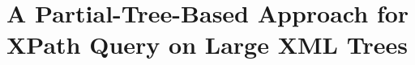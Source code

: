 \def\PT#1{\hbox{\textrm{pt}$_{#1}$}}
\def\Nc#1#2{\hbox{\texttt{#1$_{#2}$}}}
\def\Nl#1#2{\hbox{+\texttt{#1$_{#2}$}}}
\def\Nr#1#2{\hbox{\texttt{#1$_{#2}$}+}}
\def\Np#1#2{\hbox{+\texttt{#1$_{#2}$}+}}
\def\pred#1#2{#1\to\{#2\}}
\def\INDEXSET#1{\mathit{#1}_{[P]}}
\def\INDEXSETL#1{\mathit{#1}_{[p]}}

 

\newtheorem{property}{Property}


\chapter{A Partial-Tree-Based Approach for XPath Query on Large XML Trees}
 
 
















%

